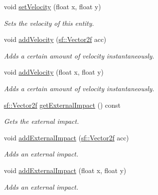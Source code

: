 \begin{DoxyCompactItemize}
void \mbox{\hyperlink{class_game_entity_a0830796cd5193dfe434e8208c3976e90}{set\+Velocity}} (float x, float y)
\begin{DoxyCompactList}\small\item\em Sets the velocity of this entity. \end{DoxyCompactList}\item 
void \mbox{\hyperlink{class_game_entity_aff58ada3571dee404e7826edde03795c}{add\+Velocity}} (\mbox{\hyperlink{classsf_1_1_vector2}{sf\+::\+Vector2f}} acc)
\begin{DoxyCompactList}\small\item\em Adds a certain amount of velocity instantaneously. \end{DoxyCompactList}\item 
void \mbox{\hyperlink{class_game_entity_a3b254daf88c48649f9c7eea21973b540}{add\+Velocity}} (float x, float y)
\begin{DoxyCompactList}\small\item\em Adds a certain amount of velocity instantaneously. \end{DoxyCompactList}\item 
\mbox{\label{class_game_entity_a474c248a7ad9e9dadb6bd39e996aa4f9}} 
\mbox{\hyperlink{classsf_1_1_vector2}{sf\+::\+Vector2f}} \mbox{\hyperlink{class_game_entity_a474c248a7ad9e9dadb6bd39e996aa4f9}{get\+External\+Impact}} () const
\begin{DoxyCompactList}\small\item\em Gets the external impact. \end{DoxyCompactList}\item 
void \mbox{\hyperlink{class_game_entity_a520a37644c64bfc71c31e26cbb9c4654}{add\+External\+Impact}} (\mbox{\hyperlink{classsf_1_1_vector2}{sf\+::\+Vector2f}} acc)
\begin{DoxyCompactList}\small\item\em Adds an external impact. \end{DoxyCompactList}\item 
void \mbox{\hyperlink{class_game_entity_a6770a10b91c8194b134a8ec2fbd987bd}{add\+External\+Impact}} (float x, float y)
\begin{DoxyCompactList}\small\item\em Adds an external impact. \end{DoxyCompactList}\item 
\mbox{\label{class_game_entity_af93afa90123d253bdf8b13ebe6c6ad95}} 

\end{DoxyCompactItemize}
